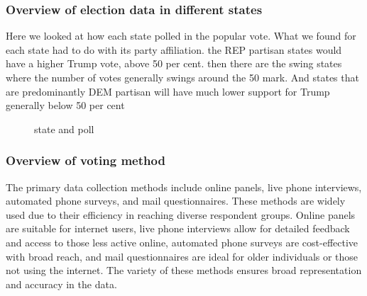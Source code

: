 \documentclass[
  letterpaper,
  DIV=11,
  numbers=noendperiod]{scrartcl}
\begin{document}
\subsubsection{Overview of election data in different
states}\label{overview-of-election-data-in-different-states}

Here we looked at how each state polled in the popular vote. What we
found for each state had to do with its party affiliation. the REP
partisan states would have a higher Trump vote, above 50 per cent. then
there are the swing states where the number of votes generally swings
around the 50 mark. And states that are predominantly DEM partisan will
have much lower support for Trump generally below 50 per cent

\begin{figure}


\caption{\label{fig-state}state and poll}

\end{figure}%

\subsubsection{Overview of voting
method}\label{overview-of-voting-method}

The primary data collection methods include online panels, live phone
interviews, automated phone surveys, and mail questionnaires. These
methods are widely used due to their efficiency in reaching diverse
respondent groups. Online panels are suitable for internet users, live
phone interviews allow for detailed feedback and access to those less
active online, automated phone surveys are cost-effective with broad
reach, and mail questionnaires are ideal for older individuals or those
not using the internet. The variety of these methods ensures broad
representation and accuracy in the data.
\end{document}
